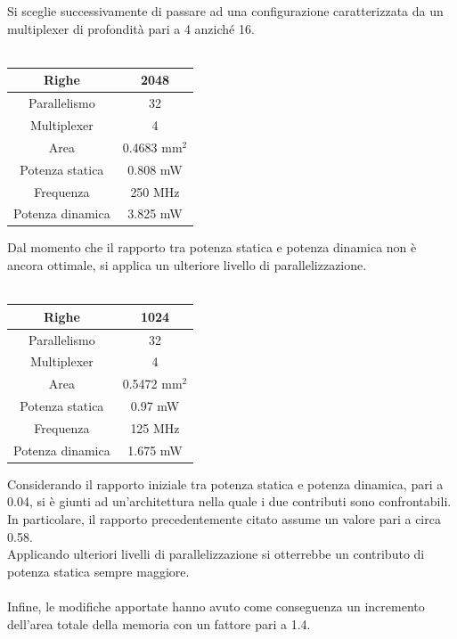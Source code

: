 \documentclass[11pt,  english, makeidx, a4paper, titlepage, oneside]{book}
\begin{document}
\vspace{0.3cm}
Si sceglie successivamente di passare ad una configurazione caratterizzata da un multiplexer di profondità pari a 4 anziché 16.
\\\\
\begin{center}
	\begin{tabular}{|c|c|}
	\hline
	Righe & 2048\\
	\hline
	Parallelismo & 32\\
	\hline
	Multiplexer & 4\\
	\hline
	Area & 0.4683 mm$^2$\\
	\hline
	Potenza statica & 0.808 mW\\
	\hline
	Frequenza & 250 MHz\\
	\hline
	Potenza dinamica & 3.825 mW\\
	\hline
	\end{tabular}	
\end{center}
\vspace{0.3cm}
Dal momento che il rapporto tra potenza statica e potenza dinamica non è ancora ottimale, si applica un ulteriore livello di parallelizzazione.
\\\\
\begin{center}
	\begin{tabular}{|c|c|}
	\hline
	Righe & 1024\\
	\hline
	Parallelismo & 32\\
	\hline
	Multiplexer & 4\\
	\hline
	Area & 0.5472 mm$^2$\\
	\hline
	Potenza statica & 0.97 mW\\
	\hline
	Frequenza & 125 MHz\\
	\hline
	Potenza dinamica & 1.675 mW\\
	\hline
	\end{tabular}	
\end{center}
\vspace{0.3cm}
Considerando il rapporto iniziale tra potenza statica e potenza dinamica, pari a 0.04, si è giunti ad un'architettura nella quale i due contributi sono confrontabili. In particolare, il rapporto precedentemente citato assume un valore pari a circa 0.58.
\\
Applicando ulteriori livelli di parallelizzazione si otterrebbe un contributo di potenza statica sempre maggiore.
\\\\
Infine, le modifiche apportate hanno avuto come conseguenza un incremento dell'area totale della memoria con un fattore pari a 1.4.
\\
\end{document}
